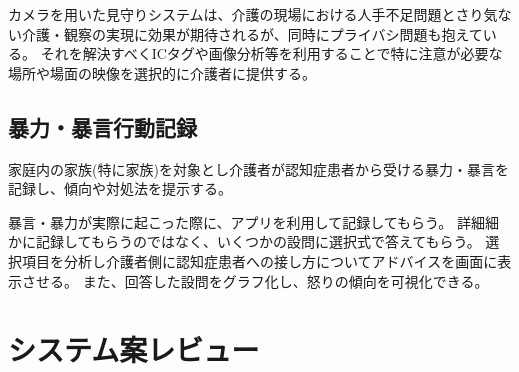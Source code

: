 \documentclass[../report]{subfiles}
\begin{document}
カメラを用いた見守りシステムは、介護の現場における人手不足問題とさり気ない介護・観察の実現に効果が期待されるが、同時にプライバシ問題も抱えている。
それを解決すべくICタグや画像分析等を利用することで特に注意が必要な場所や場面の映像を選択的に介護者に提供する。

\subsection{暴力・暴言行動記録}
家庭内の家族(特に家族)を対象とし介護者が認知症患者から受ける暴力・暴言を記録し、傾向や対処法を提示する。

暴言・暴力が実際に起こった際に、アプリを利用して記録してもらう。
詳細細かに記録してもらうのではなく、いくつかの設問に選択式で答えてもらう。
選択項目を分析し介護者側に認知症患者への接し方についてアドバイスを画面に表示させる。
また、回答した設問をグラフ化し、怒りの傾向を可視化できる。


\section{システム案レビュー}
\end{document}
